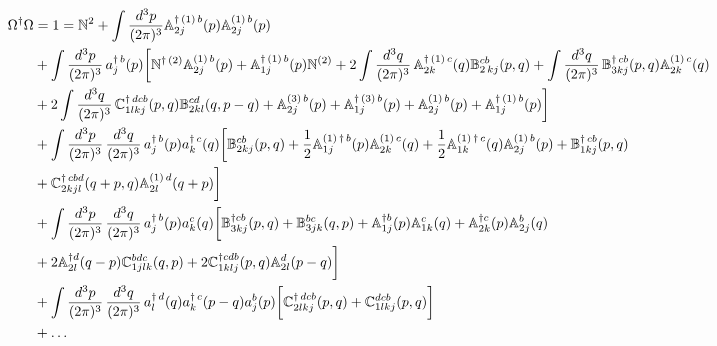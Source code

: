\documentclass[10pt]{article}
\def\mf#1{\mathbb{#1}}
\numberwithin{equation}{section}
\begin{document}
\begin{align}
     \Omega^{\dagger}\Omega & = 1 = \mf{N}^{2} + \int \frac{d^{3}p}{(2\pi)^{3}} \mf{A}^{\dagger\,(1)\, b}_{2j}(p)\mf{A}^{(1)\,b}_{2j}(p) \notag \\ & +\int \frac{d^{3}p}{(2\pi)^{3}}\, a^{\dagger\, b}_{j}(p) \bigg[\mf{N}^{\dagger\, (2)}\mf{A}^{(1)\, b}_{2j}(p)+\mf{A}^{\dagger\,(1)\, b}_{1j}(p)\mf{N}^{(2)} + 2\int\frac{d^{3}q}{(2\pi)^{3}}\,\mf{A}^{\dagger\,(1)\, c}_{2k}(q)\mf{B}^{cb}_{2\,kj}(p,q)+\int\frac{d^{3}q}{(2\pi)^{3}}\,\mf{B}^{\dagger\, cb}_{3kj}(p,q)\mf{A}^{(1)\,c}_{2k}(q)\notag \\ & +2\int\frac{d^{3}q}{(2\pi)^{3}}\,\mf{C}^{\dagger\, dcb}_{1lkj}(p,q)\mf{B}^{cd}_{2kl}(q,p-q)+\mf{A}^{(3)\, b}_{2j}(p)+\mf{A}^{\dagger\,(3)\, b}_{1j}(p)+\mf{A}^{(1)\, b}_{2j}(p)+\mf{A}^{\dagger\,(1)\, b}_{1j}(p)\bigg]\notag \\ & + \int \frac{d^{3}p}{(2\pi)^{3}}\, \frac{d^{3}q}{(2\pi)^{3}}\, a^{\dagger\, b}_{j}(p)a^{\dagger\, c}_{k}(q) \bigg[\mf{B}^{cb}_{2kj}(p,q)+\frac{1}{2}\mf{A}^{(1)\, \dagger\, b}_{1j}(p)\mf{A}^{(1)\, c}_{2k}(q)+\frac{1}{2} \mf{A}^{(1)\, \dagger\, c}_{1k}(q)\mf{A}^{(1)\, b}_{2j}(p)+\mf{B}^{\dagger\, cb}_{1kj}(p,q)\notag \\ & +\mf{C}^{\dagger\, cbd}_{2kjl}(q+p,q)\mf{A}^{(1)\,d}_{2l}(q+p)\bigg] \notag \\ & 
     + \int \frac{d^{3}p}{(2\pi)^{3}}\, \frac{d^{3}q}{(2\pi)^{3}}\, a^{\dagger\, b}_{j}(p)a^{ c}_{k}(q) \bigg[\mf{B}^{\dagger cb}_{3kj}(p,q)+\mf{B}^{bc}_{3jk}(q,p)+\mf{A}^{\dagger b}_{1j}(p)\mf{A}^{c}_{1k}(q) + \mf{A}^{\dagger c}_{2k}(p)\mf{A}^{b}_{2j}(q) \notag \\ & 
    + 2 \mf{A}^{\dagger d}_{2l}(q-p)\mf{C}^{bdc}_{1jlk}(q,p)
    + 2 
    \mf{C}^{\dagger cdb}_{1klj}
    (p,q)\mf{A}^{d}_{2l}(p-q) \bigg] \notag \\ & 
    + \int \frac{d^{3}p}{(2\pi)^{3}}\, \frac{d^{3}q}{(2\pi)^{3}}\, a^{\dagger\, d}_{l}(q)a^{\dagger\, c}_{k}(p-q)a^{b}_{j}(p)\bigg[\mf{C}^{\dagger\, dcb}_{2lkj}(p,q)+\mf{C}^{dcb}_{1lkj}(p,q)\bigg]\notag \\ & + \ldots
\end{align}
\end{document}
